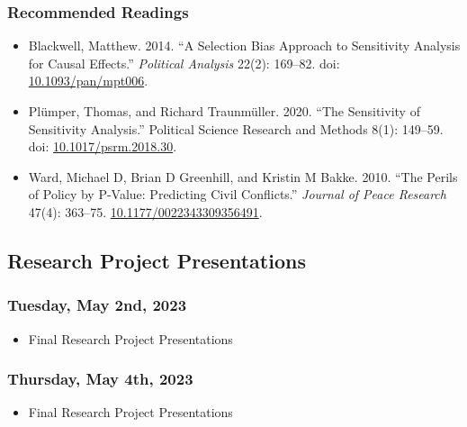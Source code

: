 \documentclass[12pt,]{article}
\providecommand{\tightlist}{%
  \setlength{\itemsep}{0pt}\setlength{\parskip}{0pt}}
\begin{document}
\hypertarget{recommended-readings-11}{%
\subsubsection{Recommended Readings}\label{recommended-readings-11}}

\begin{itemize}
\item
  Blackwell, Matthew. 2014. ``A Selection Bias Approach to Sensitivity
  Analysis for Causal Effects.'' \emph{Political Analysis} 22(2):
  169--82. doi:
  \href{https://doi.org/10.1093/pan/mpt006}{10.1093/pan/mpt006}.
\item
  Plümper, Thomas, and Richard Traunmüller. 2020. ``The Sensitivity of
  Sensitivity Analysis.'' Political Science Research and Methods 8(1):
  149--59. doi:
  \href{https://doi.org/10.1017/psrm.2018.30}{10.1017/psrm.2018.30}.
\item
  Ward, Michael D, Brian D Greenhill, and Kristin M Bakke. 2010. ``The
  Perils of Policy by P-Value: Predicting Civil Conflicts.''
  \emph{Journal of Peace Research} 47(4): 363--75.
  \href{https://doi.org/10.1177/0022343309356491}{10.1177/0022343309356491}.
\end{itemize}

\hypertarget{research-project-presentations}{%
\subsection{Research Project
Presentations}\label{research-project-presentations}}

\hypertarget{tuesday-may-2nd-2023}{%
\subsubsection{Tuesday, May 2nd, 2023}\label{tuesday-may-2nd-2023}}

\begin{itemize}
\tightlist
\item
  Final Research Project Presentations
\end{itemize}

\hypertarget{thursday-may-4th-2023}{%
\subsubsection{Thursday, May 4th, 2023}\label{thursday-may-4th-2023}}

\begin{itemize}
\tightlist
\item
  Final Research Project Presentations
\end{itemize}
\end{document}
